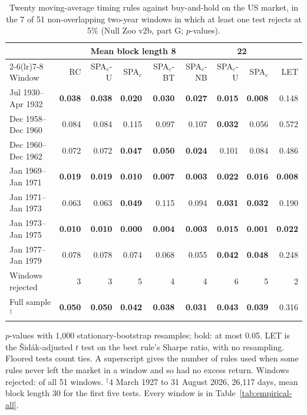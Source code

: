 \begin{table}[t]
\centering
\footnotesize
\setlength{\tabcolsep}{3.5pt}
\caption{Twenty moving-average timing rules against buy-and-hold on the US market, in the 7 of 51 non-overlapping two-year windows in which at least one test rejects at 5\% (Null Zoo v2b, part G; $p$-values).}
\label{tab:empirical}
\begin{tabular}{lrrrrrrrr}
\toprule
 & \multicolumn{5}{c}{Mean block length 8} & \multicolumn{2}{c}{22} & \multicolumn{1}{c}{} \\
\cmidrule(lr){2-6}\cmidrule(lr){7-8}
Window & RC & SPA$_c$-U & SPA$_c$ & SPA$_c$-BT & SPA$_c$-NB & SPA$_c$-U & SPA$_c$ & LET \\
\midrule
Jul 1930--Apr 1932 & \textbf{0.038} & \textbf{0.038} & \textbf{0.020} & \textbf{0.030} & \textbf{0.027} & \textbf{0.015} & \textbf{0.008} & 0.148 \\
Dec 1958--Dec 1960 & 0.084 & 0.084 & 0.115 & 0.097 & 0.107 & \textbf{0.032} & 0.056 & 0.572 \\
Dec 1960--Dec 1962 & 0.072 & 0.072 & \textbf{0.047} & \textbf{0.050} & \textbf{0.024} & 0.101 & 0.084 & 0.486 \\
Jan 1969--Jan 1971 & \textbf{0.019} & \textbf{0.019} & \textbf{0.010} & \textbf{0.007} & \textbf{0.003} & \textbf{0.022} & \textbf{0.016} & \textbf{0.008} \\
Jan 1971--Jan 1973 & 0.063 & 0.063 & \textbf{0.049} & 0.115 & 0.094 & \textbf{0.031} & \textbf{0.032} & 0.190 \\
Jan 1973--Jan 1975 & \textbf{0.010} & \textbf{0.010} & \textbf{0.000} & \textbf{0.004} & \textbf{0.003} & \textbf{0.015} & \textbf{0.001} & \textbf{0.022} \\
Jan 1977--Jan 1979 & 0.078 & 0.078 & 0.074 & 0.068 & 0.055 & \textbf{0.042} & \textbf{0.048} & 0.248 \\
\midrule
Windows rejected & 3 & 3 & 5 & 4 & 4 & 6 & 5 & 2 \\
Full sample$^{\dagger}$ & \textbf{0.050} & \textbf{0.050} & \textbf{0.042} & \textbf{0.038} & \textbf{0.031} & \textbf{0.043} & \textbf{0.039} & 0.316 \\
\bottomrule
\end{tabular}
\par\smallskip\begin{minipage}{0.97\linewidth}\footnotesize $p$-values with 1{,}000 stationary-bootstrap resamples; bold: at most 0.05. LET is the \v{S}id\'ak-adjusted $t$ test on the best rule's Sharpe ratio, with no resampling. Floored tests count ties. A superscript gives the number of rules used when some rules never left the market in a window and so had no excess return. Windows rejected: of all 51 windows. $^{\dagger}$4 March 1927 to 31 August 2026, 26{,}117 days, mean block length 30 for the first five tests. Every window is in Table~\ref{tab:empirical-all}.\end{minipage}
\end{table}

